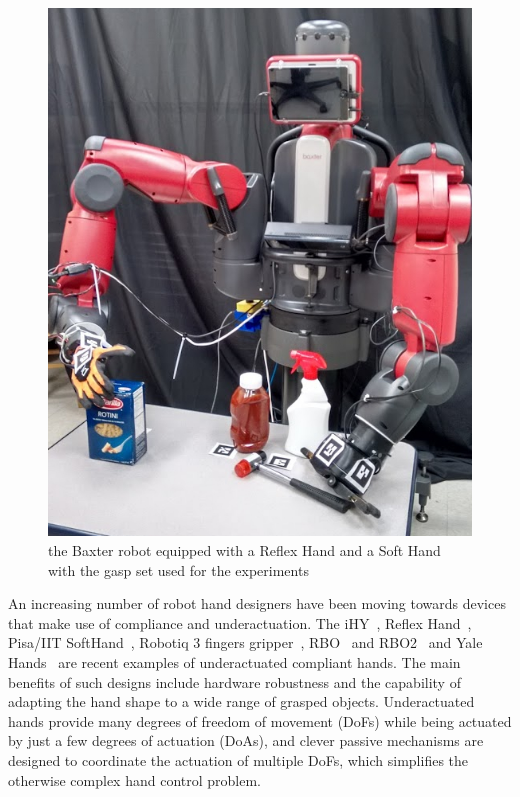 \begin{figure}[!hbt]
\begin{center}
        \includegraphics[width=0.75\columnwidth]     {images/ssoch/baxter_HDR}
        \caption{the Baxter robot equipped with a Reflex Hand and a Soft Hand with the gasp set used for the experiments}
        \label{fig:baxter}
        \end{center}
\end{figure}
An increasing number of robot hand designers have been moving towards devices that make use of compliance and underactuation. The iHY~\cite{Odhner14}, Reflex Hand~\cite{ReflexHand}, Pisa/IIT SoftHand~\cite{Catalano14}, Robotiq 3 fingers gripper~\cite{Robotiq3Finger}, RBO~\cite{Deimel13} and RBO2~\cite{Deimel14} and Yale Hands~\cite{Ma13} are recent examples of underactuated compliant hands. The main benefits of such designs include hardware robustness and the capability of adapting the hand shape to a wide range of grasped objects. Underactuated hands provide many degrees of freedom of movement (DoFs) while being actuated by just a few degrees of actuation (DoAs), and clever passive mechanisms are designed to coordinate the actuation of multiple DoFs, which simplifies the otherwise complex hand control problem. %
